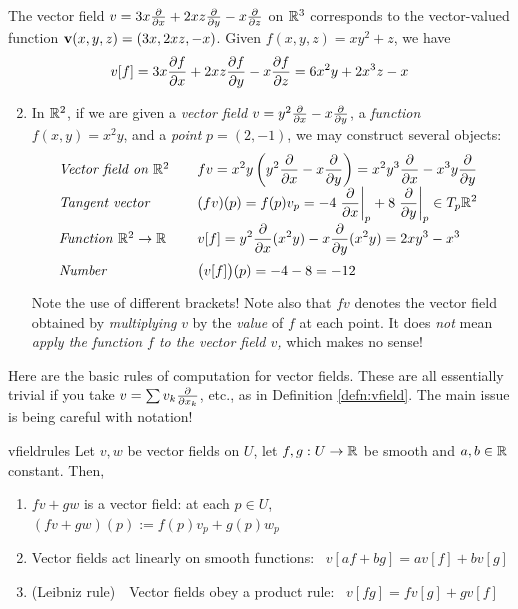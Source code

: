 \begin{examples}{}{}
\exstart The vector field $v=3x\partials{x}+2xz\partials{y}-x\partials{z}$ on $\R^3$ corresponds to the vector-valued function $\vv(x,y,z)=(3x,2xz,-x)$. Given $f(x,y,z)=xy^2+z$, we have
	\[v[f]=3x\partials[f]{x}+2xz\partials[f]{y}-x\partials[f]{z}=6x^2y+2x^3z-x\]
	
\begin{enumerate}\setcounter{enumi}{1}
	\item In $\R^2$, if we are given a \emph{vector field} $v=y^2\partials{x}-x\partials{y}$, a \emph{function} $f(x,y)=x^2y$, and a \emph{point} $p=(2,-1)$, we may construct several objects:
	\[\def\arraystretch{1.7}
	\begin{array}{@{}l@{\qquad}l}
	\text{\emph{Vector field on $\R^2$}} & \displaystyle fv=x^2y\left(y^2\partials{x}-x\partials{y}\right) =x^2y^3\partials{x}-x^3y\partials{y} \\
 	\text{\emph{Tangent vector}} & \displaystyle (fv)(p)=f(p) v_p=-4\partialsat{x}p+8\partialsat{y}p \in T_p\R^2 \\
	\text{\emph{Function} $\R^2\to\R$} & \displaystyle v[f]=y^2\partials{x}(x^2y)-x\partials{y}(x^2y)=2xy^3-x^3 \\
 	\text{\emph{Number}} & \displaystyle \bigl(v[f]\bigr)(p)=-4-8=-12
	\end{array}
	\]
	Note the use of different brackets! Note also that $fv$ denotes the vector field obtained by \emph{multiplying} $v$ by the \emph{value} of $f$ at each point. It does \emph{not} mean \emph{apply the function $f$ to the vector field $v$,} which makes no sense!
\end{enumerate}
\end{examples}

\goodbreak

Here are the basic rules of computation for vector fields. These are all essentially trivial if you take $v=\sum v_k\partials{x_k}$, etc., as in Definition \ref{defn:vfield}. The main issue is being careful with notation!

\begin{lemm}{}{vfieldrules}
Let $v,w$ be vector fields on $U$, let $f,g:U\to\R$ be smooth and $a,b\in\R$ constant. Then,
\begin{enumerate}
  \item $fv+gw$ is a vector field: at each $p\in U$, $(fv+gw)(p):=f(p)v_p+g(p)w_p$
	\item Vector fields act linearly on smooth functions: \ $v[af+bg]=av[f]+bv[g]$
	\item (Leibniz rule)\ \ Vector fields obey a product rule: \ $v[fg]=fv[g]+gv[f]$
\end{enumerate} 
\end{lemm}

